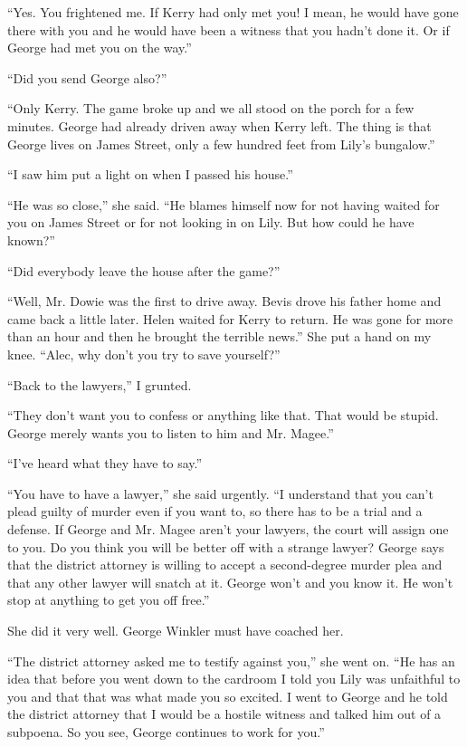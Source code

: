 \documentclass{novel}
\begin{document}
{“Yes. You frightened me. If Kerry had only met you! I mean, he would have gone there with you and he would have been a witness that you hadn’t done it. Or if George had met you on the way.”

“Did you send George also?”

“Only Kerry. The game broke up and we all stood on the porch for a few minutes. George had already driven away when Kerry left. The thing is that George lives on James Street, only a few hundred feet from Lily’s bungalow.”

“I saw him put a light on when I passed his house.”

“He was so close,” she said. “He blames himself now for not having waited for you on James Street or for not looking in on Lily. But how could he have known?”

“Did everybody leave the house after the game?”

“Well, Mr. Dowie was the first to drive away. Bevis drove his father home and came back a little later. Helen waited for Kerry to return. He was gone for more than an hour and then he brought the terrible news.” She put a hand on my knee. “Alec, why don’t you try to save yourself?”

“Back to the lawyers,” I grunted.

“They don’t want you to confess or anything like that. That would be stupid. George merely wants you to listen to him and Mr. Magee.”

“I’ve heard what they have to say.”

“You have to have a lawyer,” she said urgently. “I understand that you can’t plead guilty of murder even if you want to, so there has to be a trial and a defense. If George and Mr. Magee aren’t your lawyers, the court will assign one to you. Do you think you will be better off with a strange lawyer? George says that the district attorney is willing to accept a second-degree murder plea and that any other lawyer will snatch at it. George won’t and you know it. He won’t stop at anything to get you off free.”

She did it very well. George Winkler must have coached her.

“The district attorney asked me to testify against you,” she went on. “He has an idea that before you went down to the cardroom I told you Lily was unfaithful to you and that that was what made you so excited. I went to George and he told the district attorney that I would be a hostile witness and talked him out of a subpoena. So you see, George continues to work for you.”

}
\end{document}
